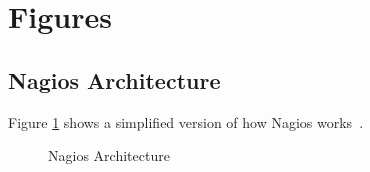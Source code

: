 \documentclass[9pt,twocolumn,twoside]{styles/osajnl}
\begin{document}


 

\section{Figures}

\subsection{Nagios Architecture}
Figure \ref{fig:Nagios-architecture} shows a simplified version of how Nagios works~\cite{nagios-book}.

\begin{figure}[htbp]
\centering
{}
\caption{Nagios Architecture}
\label{fig:Nagios-architecture}
\end{figure}

\appendix
\end{document}
